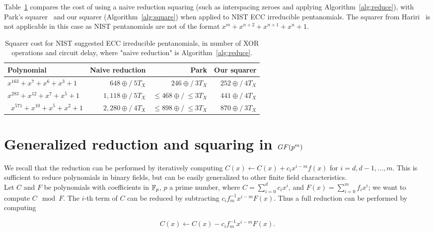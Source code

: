 Table~\ref{table:comparison_nist} compares the cost of using a naive reduction squaring (such as interspacing zeroes and applying Algorithm~\ref{alg:reduce}), with Park's squarer~\cite{park2012explicit} and our squarer (Algorithm~\ref{alg:square}) when applied to NIST ECC irreducible pentanomials. The squarer from Hariri~\cite{hariri2009bit} is not applicable in this case as NIST pentanomials are not of the format $x^m+x^{n+2}+x^{n+1}+x^{n}+1$. \\ 

\begin{table}
\centering
\smaller
\caption{Squarer cost for NIST suggested ECC irreducible pentanomials, in number of XOR operations and circuit delay, where "naive reduction" is Algorithm~\ref{alg:reduce}.}
{\begin{tabular}{l r r r} \label{table:comparison_nist}
Polynomial & Naive reduction & Park \cite{park2012explicit} & Our squarer \\ \hline
$x^{163} + x^7 + x^6 + x^3 + 1$ & $648\oplus/~5T_X$ & $246\oplus/~3T_X$ & $252\oplus/~4T_X$ \\ \hline
$x^{283} + x^{12} + x^7 + x^5 + 1$ & $1,118\oplus/~5T_X$ & $\leq468\oplus/~\leq3T_X$ & $441\oplus/~4T_X$ \\ \hline\
$x^{571} + x^{10} + x^5 + x^2 + 1$ & $2,280\oplus/~4T_X$ & $\leq898\oplus/~\leq3T_X$ & $870\oplus/~3T_X$
\end{tabular}}{}
\end{table}

\section{Generalized reduction and squaring in $GF(\MakeLowercase{p}^\MakeLowercase{m})$}

We recall that the reduction can be performed by iteratively computing $C(x) \leftarrow C(x) + c_{i} x^{i-m} f(x)$ for $i = d, d-1, \ldots, m$. This is sufficient to reduce polynomials in binary fields, but can be easily generalized to other finite field characteristics. \\

Let $C$ and $F$ be polynomials with coefficients in $\mathbb{F}_p$, $p$ a prime number, where $C = \sum_{i=0}^d c_i x^i$, and $F(x) = \sum_{i=0}^m f_i x^i$; we want to compute $C \mod F$. The $i$-th term of $C$ can be reduced by subtracting $c_i f_m^{-1} x^{i-m} F(x)$. Thus a full reduction can be performed by computing

$$C(x) \leftarrow C(x) - c_i f_m^{-1} x^{i-m} F(x).$$

